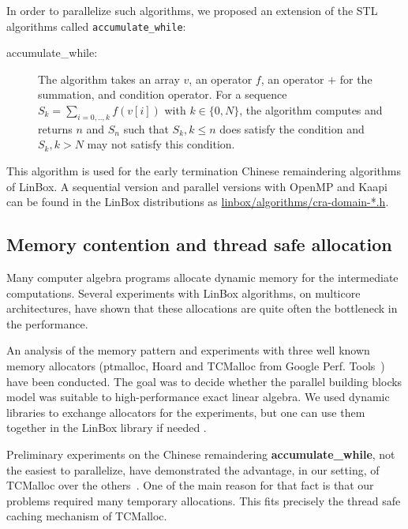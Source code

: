 \documentclass[runningheads,a4paper]{llncs}
\newcommand{\linbox}{{\sc LinBox}\xspace}
\begin{document}
In order to parallelize such algorithms, we proposed an extension of
the STL algorithms called \verb+accumulate_while+:
\begin{description} 
\item [accumulate\_while:] The algorithm takes an array $v$, an
  operator $f$, an operator $+$ for the summation, and condition
  operator.
  For a sequence $S_k = \sum_{i=0,..,k} f( v[i])$ with 
  $k \in \{0,N\}$, the algorithm computes and returns $n$ and $S_n$ such that 
  $S_k, k \leq n$ does satisfy the condition and $S_k, k > N$
  may not satisfy this condition.
\end{description} 

  This algorithm is used 
  for the early termination Chinese remaindering algorithms of
  \linbox. A sequential version and parallel versions with OpenMP and
  Kaapi can be found in the \linbox distributions as 
  \url{linbox/algorithms/cra-domain-*.h}.



\subsection{Memory contention and thread safe allocation}
Many computer algebra programs allocate dynamic memory for the
intermediate computations. Several experiments with \linbox
algorithms, on multicore architectures, have shown that these
allocations are quite often the bottleneck in the performance.

An analysis of the memory pattern and experiments with three well
known memory allocators 
(ptmalloc, Hoard and TCMalloc from Google Perf. Tools~\cite{tcmalloc})
have been conducted. The goal was to decide whether the parallel
building blocks model was suitable to high-performance exact linear
algebra. We used dynamic libraries to exchange allocators for the
experiments, but one can use them together in the \linbox library if
needed \cite[\S 7]{kaltofen:2005:memory}.

Preliminary experiments on the Chinese remaindering {\bf accumulate\_while},
not the easiest to parallelize, have demonstrated the advantage, in
our setting, of TCMalloc over the others~\cite{jgd:2010:crt}.
One of the main reason for that fact is that our problems required
many temporary allocations. This fits precisely the thread safe caching
mechanism of TCMalloc.
\end{document}
